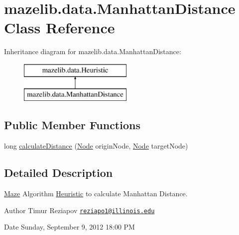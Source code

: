 \hypertarget{classmazelib_1_1data_1_1_manhattan_distance}{\section{mazelib.\-data.\-Manhattan\-Distance Class Reference}
\label{classmazelib_1_1data_1_1_manhattan_distance}
}
Inheritance diagram for mazelib.\-data.\-Manhattan\-Distance\-:\begin{figure}[H]
\begin{center}
\leavevmode
\includegraphics[height=2.000000cm]{classmazelib_1_1data_1_1_manhattan_distance}
\end{center}
\end{figure}
\subsection*{Public Member Functions}
\begin{DoxyCompactItemize}
\item 
long \hyperlink{classmazelib_1_1data_1_1_manhattan_distance_a18e097103b5b7e859b3f5d551ebcffe4}{calculate\-Distance} (\hyperlink{classmazelib_1_1data_1_1_node}{Node} origin\-Node, \hyperlink{classmazelib_1_1data_1_1_node}{Node} target\-Node)
\end{DoxyCompactItemize}


\subsection{Detailed Description}
\hyperlink{classmazelib_1_1data_1_1_maze}{Maze} Algorithm \hyperlink{interfacemazelib_1_1data_1_1_heuristic}{Heuristic} to calculate Manhattan Distance. \begin{DoxyAuthor}{Author}
Timur Reziapov \href{mailto:reziapo1@illinois.edu}{\tt reziapo1@illinois.\-edu} 
\end{DoxyAuthor}
\begin{DoxyDate}{Date}
Sunday, September 9, 2012 18\-:00 P\-M 
\end{DoxyDate}


